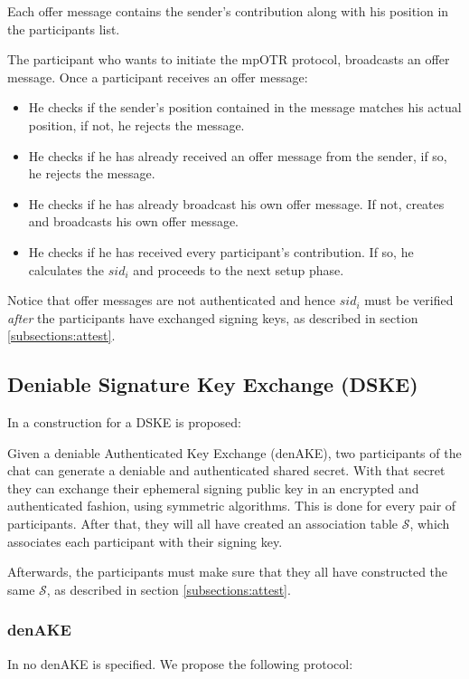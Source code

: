 Each offer message contains the sender's contribution along with his position in the participants list.

The participant who wants to initiate the mpOTR protocol, broadcasts an offer message. Once a participant receives an offer message:

\begin{itemize}
	\item[]He checks if the sender's position contained in the message matches his actual position, if not, he rejects the message.

	\item[]He checks if he has already received an offer message from the sender, if so, he rejects the message.

	\item[]He checks if he has already broadcast his own offer message. If not, creates and broadcasts his own offer message.

	\item[]He checks if he has received every participant's contribution. If so, he calculates the $sid_i$ and proceeds to the next setup phase.
\end{itemize}

Notice that offer messages are not authenticated and hence $sid_i$ must
be verified \emph{after} the participants have exchanged signing keys, as described in section \ref{subsections:attest}.


\subsection{Deniable Signature Key Exchange (DSKE)}
\label{subsections:DSKE}
In \cite{mpotr} a construction for a DSKE is proposed:

Given a deniable Authenticated Key Exchange (denAKE), two participants of the chat can generate a deniable and authenticated shared secret. With that secret they can exchange their ephemeral signing public key in an encrypted and authenticated fashion, using symmetric algorithms. This is done for every pair of participants. After that, they will all have created an association table $\mathcal{S}$, which associates each participant with their signing key.

Afterwards, the participants must make sure that they all have constructed the same $\mathcal{S}$, as described in section \ref{subsections:attest}.

\subsubsection{denAKE}
In \cite{mpotr} no denAKE is specified. We propose the following protocol:

